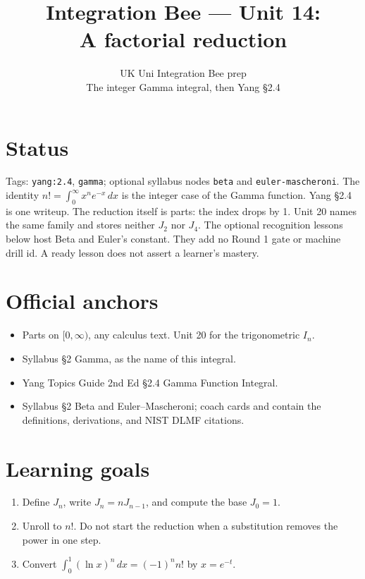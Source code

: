 
\title{Integration Bee --- Unit 14:\\ A factorial reduction}
\author{UK Uni Integration Bee prep\\ The integer Gamma integral, then Yang \S2.4}
\date{}

\maketitle
\section*{Status}
Tags: \texttt{yang:2.4}, \texttt{gamma}; optional syllabus nodes \texttt{beta} and \texttt{euler-mascheroni}.
The identity $n!=\int_0^{\infty}x^n e^{-x}\,dx$ is the integer case of the Gamma function. Yang \S2.4 is one writeup. The reduction itself is parts: the index drops by 1. Unit 20 names the same family and stores neither $J_2$ nor $J_4$.
The optional recognition lessons below host Beta and Euler's constant. They add no Round 1 gate or machine drill id. A ready lesson does not assert a learner's mastery.
\section{Official anchors}
\begin{itemize}
  \item Parts on $[0,\infty)$, any calculus text. Unit 20 for the trigonometric $I_n$.
  \item Syllabus §2 Gamma, as the name of this integral.
  \item Yang Topics Guide 2nd Ed §2.4 Gamma Function Integral.
  \item Syllabus §2 Beta and Euler--Mascheroni; coach cards  and  contain the definitions, derivations, and NIST DLMF citations.
\end{itemize}
\section{Learning goals}
\begin{enumerate}
  \item Define $J_n$, write $J_n=n J_{n-1}$, and compute the base $J_0=1$.
  \item Unroll to $n!$. Do not start the reduction when a substitution removes the power in one step.
  \item Convert $\int_0^1(\ln x)^n\,dx=(-1)^n n!$ by $x=e^{-t}$.
\end{enumerate}


